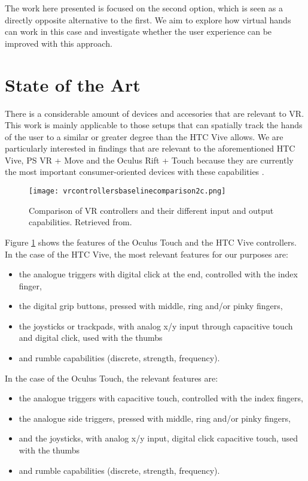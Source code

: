 The work here presented is focused on the second option, which is seen as a directly opposite alternative to the first. We aim to explore how virtual hands can work in this case and investigate whether the user experience can be improved with this approach.

\section{State of the Art}
\label{sec:stateOfTheArt}

There is a considerable amount of devices and accesories that are relevant to VR. This work is mainly applicable to those setups that can spatially track the hands of the user to a similar or greater degree than the HTC Vive allows. We are particularly interested in findings that are relevant to the aforementioned HTC Vive, PS VR + Move and the Oculus Rift + Touch because they are currently the most important consumer-oriented devices with these capabilities \parencite{Armstrong2017, SuperDataLLC2017}.

\begin{figure}[H]
\centering
\texttt{[image: vrcontrollersbaselinecomparison2c.png]}
\caption{Comparison of VR controllers and their different input and output capabilities. Retrieved from\parencite{MetanautVR2015}.}
\label{fig:vrControllerComparison}
\end{figure}

Figure \ref{fig:vrControllerComparison} shows the features of the Oculus Touch and the HTC Vive controllers. In the case of the HTC Vive, the most relevant features for our purposes are:

\begin{itemize}
\item the analogue triggers with digital click at the end, controlled with the index finger, 
\item the digital grip buttons, pressed with middle, ring and/or pinky fingers,
\item the joysticks or trackpads, with analog x/y input through capacitive touch and digital click, used with the thumbs
\item and rumble capabilities (discrete, strength, frequency).
\end{itemize}

In the case of the Oculus Touch, the relevant features are:

\begin{itemize}
\item the analogue triggers with capacitive touch, controlled with the index fingers, 
\item the analogue side triggers, pressed with middle, ring and/or pinky fingers,
\item and the joysticks, with analog x/y input, digital click capacitive touch, used with the thumbs
\item and rumble capabilities (discrete, strength, frequency).
\end{itemize}

